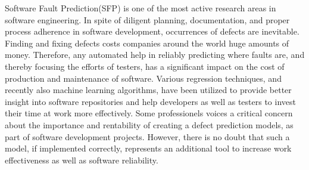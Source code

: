 Software Fault Prediction(SFP) is one of the most active research areas in software engineering. In spite of diligent planning, documentation, and proper process adherence in software development, occurrences of defects are inevitable. Finding and fixing defects costs companies around the world huge amounts of money. Therefore, any automated help in reliably predicting where faults are, and thereby focusing the efforts of testers, has a significant impact on the cost of production and maintenance of software. Various regression techniques, and recently also machine learning algorithms, have been utilized to provide better insight into software repositories and help developers as well as testers to invest their time at work more effectively. Some professionels voices a critical concern about the importance and rentability of creating a defect prediction models, as part of software development projects. However, there is no doubt that such a model, if implemented correctly, represents an additional tool to increase work effectiveness as well as software reliability.
